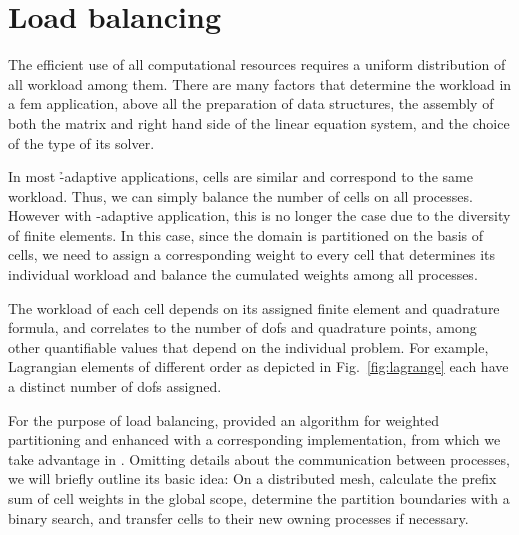\section{Load balancing}
\label{sec:balancing}

The efficient use of all computational resources requires a uniform distribution of all workload among them. There are many factors that determine the workload in a \gls{fem} application, above all the preparation of data structures, the assembly of both the matrix and right hand side of the linear equation system, and the choice of the type of its solver.

In most \h-adaptive applications, cells are similar and correspond to the same workload. Thus, we can simply balance the number of cells on all processes. However with \hp-adaptive application, this is no longer the case due to the diversity of finite elements. %
In this case, since the domain is partitioned on the basis of cells, we need to assign a corresponding weight to every cell that determines its individual workload and balance the cumulated weights among all processes.

The workload of each cell depends on its assigned finite element and quadrature formula, and correlates to the number of \glspl{dof} and quadrature points, among other quantifiable values that depend on the individual problem. For example, Lagrangian elements of different order as depicted in Fig.~\ref{fig:lagrange} each have a distinct number of \glspl{dof} assigned.





For the purpose of load balancing, \textcite[Sec.~3.3]{burstedde2011} provided an algorithm for weighted partitioning and enhanced \pforest{} \textcite{p4est22} with a corresponding implementation, from which we take advantage in \dealii{}. Omitting details about the communication between processes, we will briefly outline its basic idea: On a distributed mesh, calculate the prefix sum of cell weights in the global scope, determine the partition boundaries with a binary search, and transfer cells to their new owning processes if necessary.

